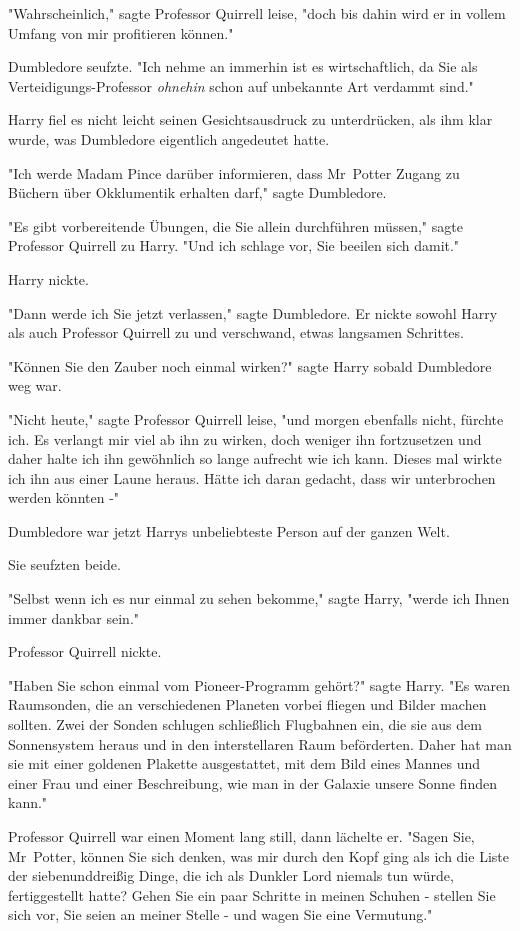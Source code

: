 {"Wahrscheinlich," sagte Professor Quirrell leise, "doch bis dahin wird er in vollem Umfang von mir profitieren können."

Dumbledore seufzte. "Ich nehme an immerhin ist es wirtschaftlich, da Sie als Verteidigungs-Professor \emph{ohnehin} schon auf unbekannte Art verdammt sind."

Harry fiel es nicht leicht seinen Gesichtsausdruck zu unterdrücken, als ihm klar wurde, was Dumbledore eigentlich angedeutet hatte.

"Ich werde Madam Pince darüber informieren, dass Mr~Potter Zugang zu Büchern über Okklumentik erhalten darf," sagte Dumbledore.

"Es gibt vorbereitende Übungen, die Sie allein durchführen müssen," sagte Professor Quirrell zu Harry. "Und ich schlage vor, Sie beeilen sich damit."

Harry nickte.

"Dann werde ich Sie jetzt verlassen," sagte Dumbledore. Er nickte sowohl Harry als auch Professor Quirrell zu und verschwand, etwas langsamen Schrittes.

"Können Sie den Zauber noch einmal wirken?" sagte Harry sobald Dumbledore weg war.

"Nicht heute," sagte Professor Quirrell leise, "und morgen ebenfalls nicht, fürchte ich. Es verlangt mir viel ab ihn zu wirken, doch weniger ihn fortzusetzen und daher halte ich ihn gewöhnlich so lange aufrecht wie ich kann. Dieses mal wirkte ich ihn aus einer Laune heraus. Hätte ich daran gedacht, dass wir unterbrochen werden könnten -"

Dumbledore war jetzt Harrys unbeliebteste Person auf der ganzen Welt.

Sie seufzten beide.

"Selbst wenn ich es nur einmal zu sehen bekomme," sagte Harry, "werde ich Ihnen immer dankbar sein."

Professor Quirrell nickte.

"Haben Sie schon einmal vom Pioneer-Programm gehört?" sagte Harry. "Es waren Raumsonden, die an verschiedenen Planeten vorbei fliegen und Bilder machen sollten. Zwei der Sonden schlugen schließlich Flugbahnen ein, die sie aus dem Sonnensystem heraus und in den interstellaren Raum beförderten. Daher hat man sie mit einer goldenen Plakette ausgestattet, mit dem Bild eines Mannes und einer Frau und einer Beschreibung, wie man in der Galaxie unsere Sonne finden kann."

Professor Quirrell war einen Moment lang still, dann lächelte er. "Sagen Sie, Mr~Potter, können Sie sich denken, was mir durch den Kopf ging als ich die Liste der siebenunddreißig Dinge, die ich als Dunkler Lord niemals tun würde, fertiggestellt hatte? Gehen Sie ein paar Schritte in meinen Schuhen - stellen Sie sich vor, Sie seien an meiner Stelle - und wagen Sie eine Vermutung."

}
